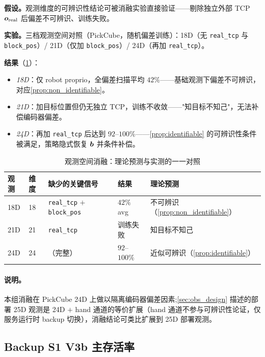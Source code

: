 \textbf{假设。}观测维度的可辨识性结论可被消融实验直接验证——剔除独立外部 TCP $\bm{o}_\text{real}$ 后偏差不可辨识、训练失败。

\textbf{实验。}三档观测空间对照（PickCube，随机偏差训练）：18D（无 \texttt{real\_tcp} 与 \texttt{block\_pos}）/ 21D（仅加 \texttt{block\_pos}）/ 24D（再加 \texttt{real\_tcp}）。

\textbf{结果}（\cref{tab:ablation_obs}）：
\begin{itemize}
  \item \emph{18D}：仅 robot proprio，全偏差扫描平均 $42\%$——基础观测下偏差不可辨识，对应\cref{prop:non_identifiable}。
  \item \emph{21D}：加目标位置但仍无独立 TCP，训练不收敛——"知目标不知己"，无法补偿编码器偏差。
  \item \emph{24D}：再加 \texttt{real\_tcp} 后达到 $92$–$100\%$——\cref{prop:identifiable} 的可辨识性条件被满足，策略隐式恢复 $\bm{b}$ 并条件补偿。
\end{itemize}

\begin{table}[htbp]
  \centering
  \caption{观测空间消融：理论预测与实测的一一对照}
  \label{tab:ablation_obs}
  \footnotesize
  \begin{tabular}{@{}lllll@{}}
    \toprule
    观测 & 维度 & 缺少的关键信号 & 结果 & 理论预测 \\
    \midrule
    18D & 18 & \texttt{real\_tcp} $+$ \texttt{block\_pos} & $42\%$ avg & 不可辨识（\cref{prop:non_identifiable}） \\
    21D & 21 & \texttt{real\_tcp} & 训练失败 & 知目标不知己 \\
    24D & 24 & （完整） & $92$–$100\%$ & 近似可辨识（\cref{prop:identifiable}） \\
    \bottomrule
  \end{tabular}
\end{table}

\paragraph{说明。}本组消融在 PickCube 24D 上做以隔离编码器偏差因素;\cref{sec:obs_design} 描述的部署 25D 观测是 24D $+$ hand 通道的等价扩展（hand 通道不参与可辨识性论证，仅服务运行时 backup 切换），消融结论可类比扩展到 25D 部署观测。

\subsection{Backup S1 V3b 主存活率}\label{sec:exp_backup_s1}

